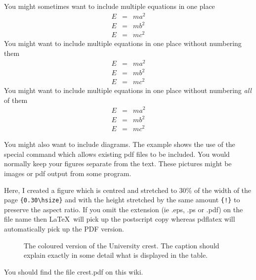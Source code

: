\documentclass[12pt,a4paper]{report}
\begin{document}
You might sometimes want to include multiple equations in one place
\begin{eqnarray}
  E &=& ma^{2} \\
  E &=& mb^{2} \\
  E &=& mc^{2}
\end{eqnarray}
You might want to include multiple equations in one place without
numbering them
\begin{eqnarray*}
  E &=& ma^{2} \\
  E &=& mb^{2} \\
  E &=& mc^{2}
\end{eqnarray*}
You might want to include multiple equations in one place without
numbering \emph{all} of them
\begin{eqnarray}
  E &=& ma^{2} \nonumber \\
  E &=& mb^{2} \nonumber \\
  E &=& mc^{2}
\end{eqnarray}

You might also want to include diagrams.  The example shows the use of
the special command which allows existing pdf files to be included.
You would normally keep your figures separate from the text.  These
pictures might be images or pdf output from some program.

Here, I created a figure which is centred and stretched to 30\% of the
width of the page \verb+{0.30\hsize}+ and with the height stretched by
the same amount \verb+{!}+ to preserve the aspect ratio. If you omit
the extension (ie .eps, .ps or .pdf) on the file name then \LaTeX\ will
pick up the postscript copy whereas pdflatex will automatically pick
up the PDF version.


\begin{figure}

\begin{center}
\end{center}

\caption{The coloured version of the University crest. The caption should explain exactly in some detail what is displayed in the table.}
\label{fig:eucrest}

\end{figure}

You should find the file crest.pdf on this wiki.

\end{document}
